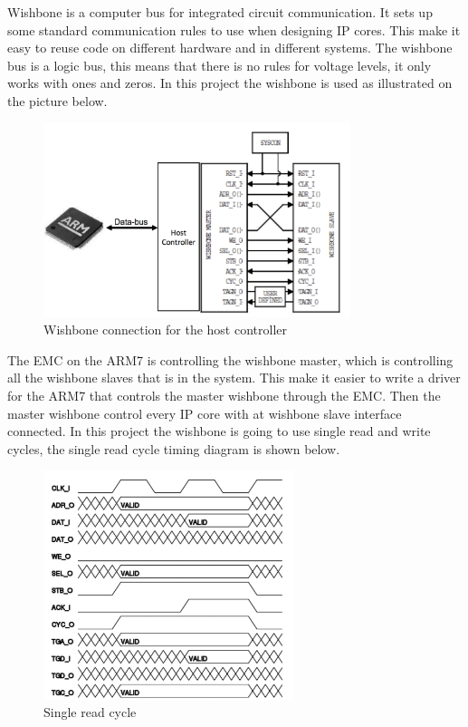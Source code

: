 Wishbone is a computer bus for integrated circuit communication. It sets up some standard communication rules to use when designing IP cores. This make it easy to reuse code on different hardware and in different systems. The wishbone bus is a logic bus, this means that there is no rules for voltage levels, it only works with ones and zeros. In this project the wishbone is used as illustrated on the picture below.
\begin{figure}[H]
	\begin{centering}
		 \includegraphics[width=0.8\textwidth]{images/typical_usage.png}
		\caption{Wishbone connection for the host controller}
	\end{centering}
\end{figure}
The EMC on the ARM7 is controlling the wishbone master, which is controlling all the wishbone slaves that is in the system. This make it easier to write a driver for the ARM7 that controls the master wishbone through the EMC. Then the master wishbone control every IP core with at wishbone slave interface connected. In this project the wishbone is going to use single read and write cycles, the single read cycle timing diagram is shown below.
\begin{figure}[H]
	\begin{centering}
		 \includegraphics[width=0.65\textwidth]{images/wb_single_read.png}
		\caption{Single read cycle}
	\end{centering}
\end{figure}
